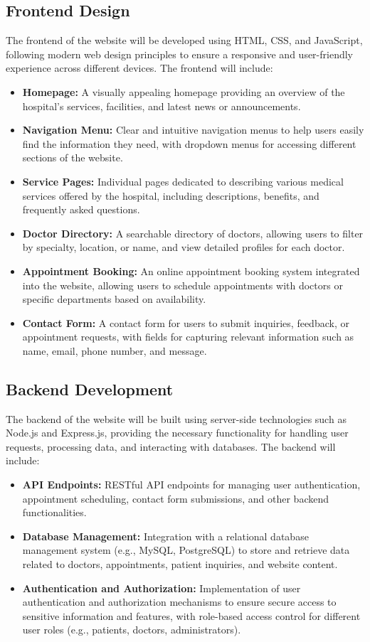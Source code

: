 \documentclass{article}
\begin{document}
\subsection{Frontend Design}
The frontend of the website will be developed using HTML, CSS, and JavaScript, following modern web design principles to ensure a responsive and user-friendly experience across different devices. The frontend will include:
\begin{itemize}
    \item \textbf{Homepage:} A visually appealing homepage providing an overview of the hospital's services, facilities, and latest news or announcements.
    \item \textbf{Navigation Menu:} Clear and intuitive navigation menus to help users easily find the information they need, with dropdown menus for accessing different sections of the website.
    \item \textbf{Service Pages:} Individual pages dedicated to describing various medical services offered by the hospital, including descriptions, benefits, and frequently asked questions.
    \item \textbf{Doctor Directory:} A searchable directory of doctors, allowing users to filter by specialty, location, or name, and view detailed profiles for each doctor.
    \item \textbf{Appointment Booking:} An online appointment booking system integrated into the website, allowing users to schedule appointments with doctors or specific departments based on availability.
    \item \textbf{Contact Form:} A contact form for users to submit inquiries, feedback, or appointment requests, with fields for capturing relevant information such as name, email, phone number, and message.
\end{itemize}

\subsection{Backend Development}
The backend of the website will be built using server-side technologies such as Node.js and Express.js, providing the necessary functionality for handling user requests, processing data, and interacting with databases. The backend will include:
\begin{itemize}
    \item \textbf{API Endpoints:} RESTful API endpoints for managing user authentication, appointment scheduling, contact form submissions, and other backend functionalities.
    \item \textbf{Database Management:} Integration with a relational database management system (e.g., MySQL, PostgreSQL) to store and retrieve data related to doctors, appointments, patient inquiries, and website content.
    \item \textbf{Authentication and Authorization:} Implementation of user authentication and authorization mechanisms to ensure secure access to sensitive information and features, with role-based access control for different user roles (e.g., patients, doctors, administrators).
\end{itemize}
\end{document}
